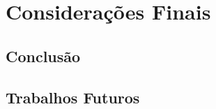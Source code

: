 \chapter{Considerações Finais} \label{cap:cap7}

\section{Conclusão}
\label{sec:conclusão}


\section{Trabalhos Futuros}
\label{sec:trabFuturo}





